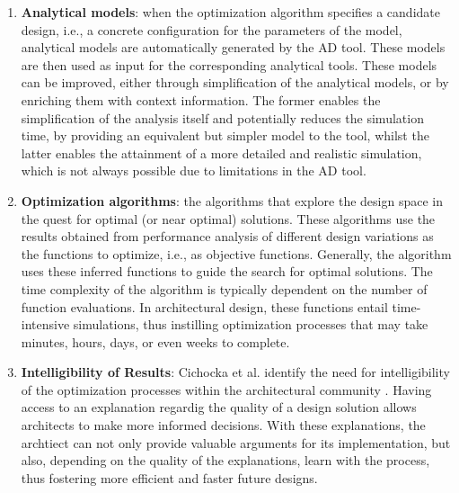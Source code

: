 \begin{enumerate}
\item \textbf{Analytical models}: when the optimization algorithm specifies a candidate design, i.e., a concrete configuration for the parameters of the model, analytical models are automatically generated by the \ac{AD} tool. These models are then used as input for the corresponding analytical tools. These models can be improved, either through simplification of the analytical models, or by enriching them with context information. The former enables the simplification of the analysis itself and potentially reduces the simulation time, by providing an equivalent but simpler model to the tool, whilst the latter enables the attainment of a more detailed and realistic simulation, which is not always possible due to limitations in the \ac{AD} tool. 

\item \textbf{Optimization algorithms}: the algorithms that explore the design space in the quest for optimal (or near optimal) solutions. These algorithms use the results obtained from performance analysis of different design variations as the functions to optimize, i.e., as objective functions. Generally, the algorithm uses these inferred functions to guide the search for optimal solutions. The time complexity of the algorithm is typically dependent on the number of function evaluations. In architectural design, these functions entail time-intensive simulations, thus instilling optimization processes that may take minutes, hours, days, or even weeks to complete.

\item \textbf{Intelligibility of Results}: Cichocka et al. identify the need for intelligibility of the optimization processes within the architectural community \cite{Cichocka2017SURVEY}. Having access to an explanation regardig the quality of a design solution allows architects to make more informed decisions. With these explanations, the archtiect can not only provide valuable arguments for its implementation, but also, depending on the quality of the explanations, learn with the process, thus fostering more efficient and faster future designs. 


\end{enumerate}
